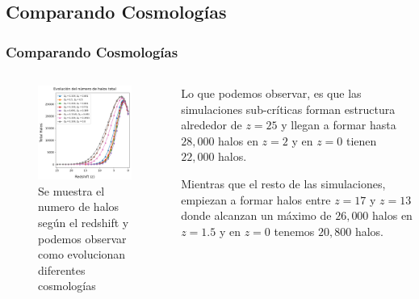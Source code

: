 \documentclass{beamer}
\begin{document}
\subsection{Comparando Cosmologías}
	\begin{frame}
		\frametitle{Comparando Cosmologías}
		\begin{columns}[t]
           	\begin{column}{.5\textwidth}

				\begin{figure}
					\centering
					\includegraphics[scale=0.31]{Conc/TotalHalos_Conc.png}
					\caption{\footnotesize Se muestra el numero de halos según el redshift y podemos observar como evolucionan diferentes cosmologías }
					\label{fig:TotalHalos_Conc}
				\end{figure}

	        \end{column}
    	    \begin{column}{.5\textwidth}

    	    	Lo que podemos observar, es que las simulaciones sub-críticas forman estructura alrededor de $z=25$ y llegan a formar hasta $28,000$ halos en $z=2$ y en $z=0$  tienen $22,000$ halos.
    	    	
    	    	Mientras que el resto de las simulaciones, empiezan a formar halos entre $z=17$ y $z=13$ donde alcanzan un máximo de $26,000$ halos en $z=1.5$ y en $z=0$ tenemos $20,800$ halos.

        	\end{column}
	    \end{columns}

	\end{frame}
\end{document}
